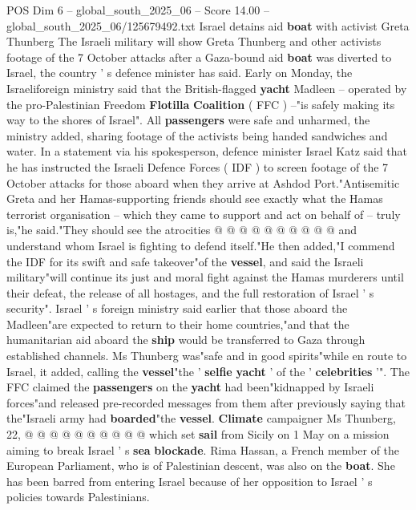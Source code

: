 \begin{textsample}{POS Dim 6 – global\_south\_2025\_06 – Score 14.00 – global\_south\_2025\_06/125679492.txt}  \label{ex:f6_pos_014}
Israel detains aid \textbf{boat} with activist Greta Thunberg The Israeli military will show Greta Thunberg and other activists footage of the 7 October attacks after a Gaza-bound aid \textbf{boat} was diverted to Israel, the country ' s defence minister has said.
Early on Monday, the Israeliforeign ministry said that the British-flagged \textbf{yacht} Madleen -- operated by the pro-Palestinian Freedom \textbf{Flotilla} \textbf{Coalition} ( FFC ) --"is safely making its way to the shores of Israel".
All \textbf{passengers} were safe and unharmed, the ministry added, sharing footage of the activists being handed sandwiches and water.
In a statement via his spokesperson, defence minister Israel Katz said that he has instructed the Israeli Defence Forces ( IDF ) to screen footage of the 7 October attacks for those aboard when they arrive at Ashdod Port."Antisemitic Greta and her Hamas-supporting friends should see exactly what the Hamas terrorist organisation -- which they came to support and act on behalf of -- truly is,"he said."They should see the atrocities @ @ @ @ @ @ @ @ @ @ and understand whom Israel is fighting to defend itself."He then added,"I commend the IDF for its swift and safe takeover"of the \textbf{vessel}, and said the Israeli military"will continue its just and moral fight against the Hamas murderers until their defeat, the release of all hostages, and the full restoration of Israel ' s security".
Israel ' s foreign ministry said earlier that those aboard the Madleen"are expected to return to their home countries,"and that the humanitarian aid aboard the \textbf{ship} would be transferred to Gaza through established channels.
Ms Thunberg was"safe and in good spirits"while en route to Israel, it added, calling the \textbf{vessel}"the ' \textbf{selfie} \textbf{yacht} ' of the ' \textbf{celebrities} '".
The FFC claimed the \textbf{passengers} on the \textbf{yacht} had been"kidnapped by Israeli forces"and released pre-recorded messages from them after previously saying that the"Israeli army had \textbf{boarded}"the \textbf{vessel}. \textbf{Climate} campaigner Ms Thunberg, 22, @ @ @ @ @ @ @ @ @ @ which set \textbf{sail} from Sicily on 1 May on a mission aiming to break Israel ' s \textbf{sea} \textbf{blockade}.
Rima Hassan, a French member of the European Parliament, who is of Palestinian descent, was also on the \textbf{boat}.
She has been barred from entering Israel because of her opposition to Israel ' s policies towards Palestinians.

\end{textsample}
